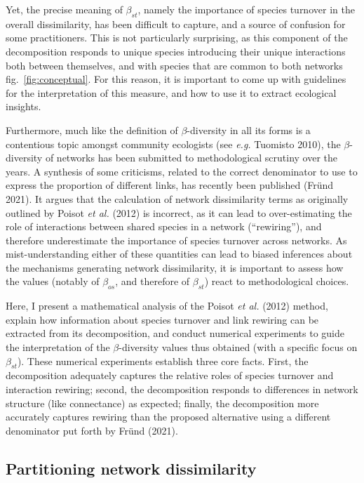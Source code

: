 \documentclass[11pt]{article}
\begin{document}
Yet, the precise meaning of \(\beta_{st}\), namely the importance of
species turnover in the overall dissimilarity, has been difficult to
capture, and a source of confusion for some practitioners. This is not
particularly surprising, as this component of the decomposition responds
to unique species introducing their unique interactions both between
themselves, and with species that are common to both networks
fig.~\ref{fig:conceptual}. For this reason, it is important to come up
with guidelines for the interpretation of this measure, and how to use
it to extract ecological insights.

Furthermore, much like the definition of \(\beta\)-diversity in all its
forms is a contentious topic amongst community ecologists (see
\emph{e.g.} Tuomisto 2010), the \(\beta\)-diversity of networks has been
submitted to methodological scrutiny over the years. A synthesis of some
criticisms, related to the correct denominator to use to express the
proportion of different links, has recently been published (Fründ 2021).
It argues that the calculation of network dissimilarity terms as
originally outlined by Poisot \emph{et al.} (2012) is incorrect, as it
can lead to over-estimating the role of interactions between shared
species in a network (``rewiring''), and therefore underestimate the
importance of species turnover across networks. As mist-understanding
either of these quantities can lead to biased inferences about the
mechanisms generating network dissimilarity, it is important to assess
how the values (notably of \(\beta_{os}\), and therefore of
\(\beta_{st}\)) react to methodological choices.

Here, I present a mathematical analysis of the Poisot \emph{et al.}
(2012) method, explain how information about species turnover and link
rewiring can be extracted from its decomposition, and conduct numerical
experiments to guide the interpretation of the \(\beta\)-diversity
values thus obtained (with a specific focus on \(\beta_{st}\)). These
numerical experiments establish three core facts. First, the
decomposition adequately captures the relative roles of species turnover
and interaction rewiring; second, the decomposition responds to
differences in network structure (like connectance) as expected;
finally, the decomposition more accurately captures rewiring than the
proposed alternative using a different denominator put forth by Fründ
(2021).

\hypertarget{partitioning-network-dissimilarity}{%
\subsection{Partitioning network
dissimilarity}\label{partitioning-network-dissimilarity}}
\end{document}
